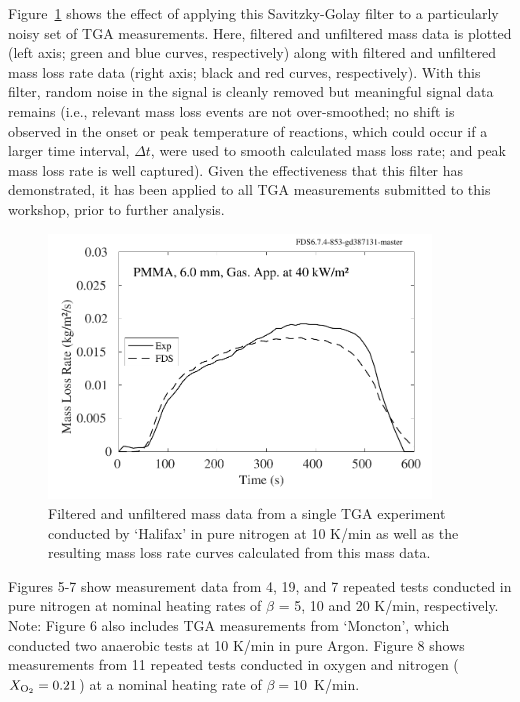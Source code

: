 \documentclass{book}
\begin{document}
Figure~\ref{Fig_4} shows the effect of applying this Savitzky-Golay filter to a particularly noisy set of TGA measurements. Here, filtered and unfiltered mass data is plotted (left axis; green and blue curves, respectively) along with filtered and unfiltered mass loss rate data (right axis; black and red curves, respectively). With this filter, random noise in the signal is cleanly removed but meaningful signal data remains (i.e., relevant mass loss events are not over-smoothed; no shift is observed in the onset or peak temperature of reactions, which could occur if a larger time interval, $\Delta t$, were used to smooth calculated mass loss rate; and peak mass loss rate is well captured). Given the effectiveness that this filter has demonstrated, it has been applied to all TGA measurements submitted to this workshop, prior to further analysis.

\begin{figure}
  \centering
  \includegraphics[width=4in]{SCRIPT_FIGURES/PMMA_40}
  \caption{Filtered and unfiltered mass data from a single TGA experiment conducted by ‘Halifax’ in pure nitrogen at 10 K/min as well as the resulting mass loss rate curves calculated from this mass data.}
  \label{Fig_4}
\end{figure}

Figures 5-7 show measurement data from 4, 19, and 7 repeated tests conducted in pure nitrogen at nominal heating rates of $\beta$ = 5, 10 and 20 K/min, respectively. Note: Figure 6 also includes TGA measurements from ‘Moncton’, which conducted two anaerobic tests at 10 K/min in pure Argon. Figure 8 shows measurements from 11 repeated tests conducted in oxygen and nitrogen ($X_{\rm O_2}=0.21$) at a nominal heating rate of $\beta=10$~K/min.
\end{document}

